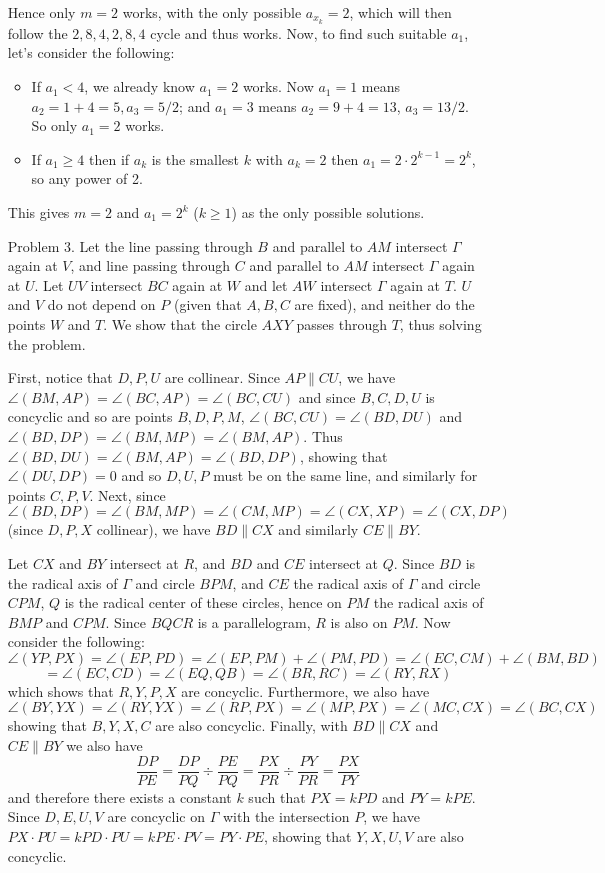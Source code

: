 \documentclass[11pt,a4paper]{article}
\begin{document}
\begin{enumerate}
	Hence only $m=2$ works, with the only possible $a_{x_k}=2$, which will then follow the $2, 8, 4, 2, 8, 4$ cycle and thus works. Now, to find such suitable $a_1$, let's consider the following:
	\begin{itemize}
		\item If $a_1<4$, we already know $a_1=2$ works. Now $a_1=1$ means $a_2=1+4=5, a_3=5/2$; and $a_1=3$ means $a_2=9+4=13$, $a_3=13/2$. So only $a_1=2$ works. 
		
		\item If $a_1\ge 4$ then if $a_k$ is the smallest $k$ with $a_k=2$ then $a_1=2\cdot 2^{k-1}=2^k$, so any power of 2. 
	\end{itemize}
	This gives $m=2$ and $a_1=2^k$ ($k\ge 1$) as the only possible solutions. 
	
	\item[Problem 3.]
	Let the line passing through $B$ and parallel to $AM$ intersect $\Gamma$ again at $V$, and line passing through $C$ and parallel to $AM$ intersect $\Gamma$ again at $U$. Let $UV$ intersect $BC$ again at $W$ and let $AW$ intersect $\Gamma$ again at $T$. $U$ and $V$ do not depend on $P$ (given that $A, B, C$ are fixed), and neither do the points $W$ and $T$. We show that the circle $AXY$ passes through $T$, thus solving the problem. 
	
	First, notice that $D, P, U$ are collinear. Since $AP\parallel CU$, we have $\angle(BM, AP)=\angle (BC, AP) = \angle (BC, CU)$ and since $B, C, D, U$ is concyclic and so are points $B, D, P, M$, $\angle (BC, CU)=\angle (BD, DU)$ and $\angle (BD, DP)=\angle (BM, MP)=\angle (BM, AP)$. Thus $\angle (BD, DU)=\angle (BM, AP)=\angle (BD, DP)$, showing that $\angle(DU, DP)=0$ and so $D, U, P$ must be on the same line, and similarly for points $C, P, V$. Next, since $\angle (BD, DP)=\angle (BM, MP)=\angle (CM, MP)=\angle (CX, XP)=\angle (CX, DP)$ (since $D, P, X$ collinear), we have $BD\parallel CX$ and similarly $CE\parallel BY$. 
	
	Let $CX$ and $BY$ intersect at $R$, and $BD$ and $CE$ intersect at $Q$. Since $BD$ is the radical axis of $\Gamma$ and circle $BPM$, and $CE$ the radical axis of $\Gamma$ and circle $CPM$, $Q$ is the radical center of these circles, hence on $PM$ the radical axis of $BMP$ and $CPM$. Since $BQCR$ is a parallelogram, $R$ is also on $PM$. Now consider the following: 
	\[\angle (YP, PX)=\angle (EP, PD)=\angle (EP, PM)+\angle (PM, PD)=\angle(EC, CM)+\angle (BM, BD)
	\]
	\[
	=\angle (EC, CD)=\angle (EQ, QB)=\angle (BR, RC)=\angle (RY, RX)
	\]
	which shows that $R, Y, P, X$ are concyclic. Furthermore, we also have 
	\[\angle (BY, YX)=\angle (RY, YX)=\angle (RP, PX)=\angle (MP, PX)=\angle (MC, CX)=\angle(BC, CX)
	\]
	showing that $B, Y, X, C$ are also concyclic. 
	Finally, with $BD\parallel CX$ and $CE\parallel BY$ we also have 
	\[
	\frac{DP}{PE}=\frac{DP}{PQ}\div \frac{PE}{PQ}=\frac{PX}{PR}\div \frac{PY}{PR}=\frac{PX}{PY}
	\]
	and therefore there exists a constant $k$ such that $PX=kPD$ and $PY=kPE$. Since $D, E, U, V$ are concyclic on $\Gamma$ with the intersection $P$, we have $PX\cdot PU=kPD\cdot PU=kPE\cdot PV=PY\cdot PE$, showing that $Y, X, U, V$ are also concyclic. 
	

\end{enumerate}
\end{document}
